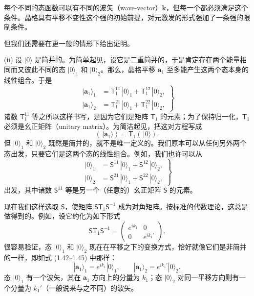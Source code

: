 每个不同的态函数可以有不同的波矢（wave-vector）$\mathbf{k}$，但每一个都必须满足这个条件。晶格具有平移不变性这个强的初始前提，对元激发的形式强加了一条强的限制条件。

但我们还需要在更一般的情形下给出证明。

(ii) 设 $|0\rangle$ 是简并的。为简单起见，设它是二重简并的，于是肯定存在两个能量相同而又彼此不同的态 $|0\rangle_1$ 和 $|0\rangle_2$。那么，晶格平移 $\mathbf{a}_1$ 至多能产生这两个态本身的线性组合。于是
\begin{equation*}
\left.\begin{aligned}
|\mathbf{a}_1\rangle_1&=\mathsf{T}_1^{11}\,|0\rangle_1+\mathsf{T}_1^{12}\,|0\rangle_2,\\
|\mathbf{a}_1\rangle_2&=\mathsf{T}_1^{21}\,|0\rangle_1+\mathsf{T}_1^{22}\,|0\rangle_2,
\end{aligned}\right\}
\tag{1.49}
\end{equation*}
诸数 $\mathsf{T}_1^{11}$ 等之所以这样书写，是因为它们是矩阵 $\mathsf{T}_1$ 的元素；为了保持归一化，$\mathsf{T}_1$ 必须是幺正矩阵（unitary matrix）。为简洁起见，把这对方程写成
\begin{equation*}
\left(\,|\mathbf{a}_1\rangle\right)=\mathsf{T}_1\left(\,|0\rangle\right).
\tag{1.50}
\end{equation*}
但 $|0\rangle_1$ 和 $|0\rangle_2$ 既然是简并的，就不是唯一定义的。我们原本可以从任何另外两个态出发，只要它们是这两个态的线性组合。例如，我们也许可以从
\begin{equation*}
\left.\begin{aligned}
|0\rangle_1&=\mathsf{S}^{11}\,|0\rangle_1+\mathsf{S}^{12}\,|0\rangle_2,\\
|0\rangle_2&=\mathsf{S}^{21}\,|0\rangle_1+\mathsf{S}^{22}\,|0\rangle_2,
\end{aligned}\right\}
\tag{1.51}
\end{equation*}
出发，其中诸数 $\mathsf{S}^{11}$ 等是另一个（任意的）幺正矩阵 $\mathsf{S}$ 的元素。

现在我们这样选取 $\mathsf{S}$，使矩阵 $\mathsf{S}\mathsf{T}_1\mathsf{S}^{-1}$ 成为对角矩阵。按标准的代数理论，这总是做得到的。例如，设它约化为如下形式
\begin{equation*}
\mathsf{S}\mathsf{T}_1\mathsf{S}^{-1}=
\begin{pmatrix}
e^{ik_1} & 0\\
0 & e^{ik_1'}
\end{pmatrix}.
\tag{1.52}
\end{equation*}
很容易验证，态 $|0\rangle_1$ 和 $|0\rangle_2$ 现在在平移之下的变换方式，恰好就像它们是非简并的一样，即如式 (1.42–1.45) 中那样：
\begin{equation*}
|\mathbf{a}_1\rangle_1=e^{ik_1}|0\rangle_1,\qquad|\mathbf{a}_1\rangle_2=e^{ik_1'}|0\rangle_2.
\tag{1.53}
\end{equation*}
态 $|0\rangle_1$ 有一个波矢，其在 $\mathbf{a}_1$ 方向上的分量为 $k_1$；态 $|0\rangle_2$ 对同一平移方向则有一个分量为 $k_1'$（一般说来与之不同）的波矢。

